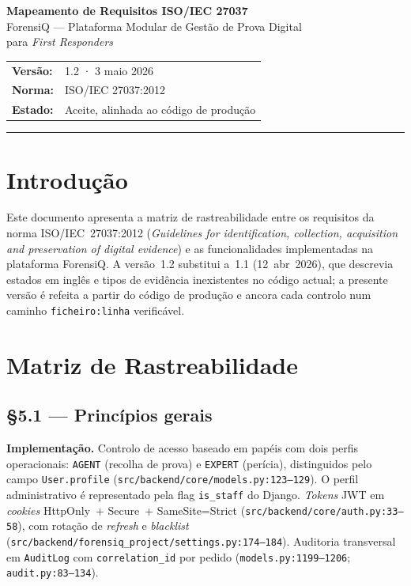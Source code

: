 \documentclass[a4paper,11pt]{article}
\begin{document}

\begin{center}
    {\LARGE\bfseries Mapeamento de Requisitos ISO/IEC 27037}\\[0.4em]
    {\large ForensiQ --- Plataforma Modular de Gestão de Prova Digital\\
    para \emph{First Responders}}\\[1.2em]
    \begin{tabular}{ll}
        \textbf{Versão:} & 1.2 · 3 maio 2026 \\
        \textbf{Norma:}  & ISO/IEC 27037:2012 \\
        \textbf{Estado:} & Aceite, alinhada ao código de produção \\
    \end{tabular}
\end{center}

\vspace{0.5em}\hrule\vspace{1.5em}

\section{Introdução}

Este documento apresenta a matriz de rastreabilidade entre os requisitos
da norma ISO/IEC~27037:2012 (\emph{Guidelines for identification,
collection, acquisition and preservation of digital evidence}) e as
funcionalidades implementadas na plataforma ForensiQ. A versão~1.2
substitui a~1.1 (12~abr~2026), que descrevia estados em inglês e tipos
de evidência inexistentes no código actual; a presente versão é
refeita a partir do código de produção e ancora cada controlo num
caminho \texttt{ficheiro:linha} verificável.

\section{Matriz de Rastreabilidade}

\subsection*{§5.1 --- Princípios gerais}

\textbf{Implementação.} Controlo de acesso baseado em papéis com dois
perfis operacionais: \texttt{AGENT} (recolha de prova) e \texttt{EXPERT}
(perícia), distinguidos pelo campo \texttt{User.profile}
(\texttt{src/backend/core/models.py:123--129}). O perfil
administrativo é representado pela flag \texttt{is\_staff} do Django.
\emph{Tokens} JWT em \emph{cookies} HttpOnly~+ Secure~+ SameSite=Strict
(\texttt{src/backend/core/auth.py:33--58}), com rotação de \emph{refresh}
e \emph{blacklist}
(\texttt{src/backend/forensiq\_project/settings.py:174--184}). Auditoria
transversal em \texttt{AuditLog} com \texttt{correlation\_id} por pedido
(\texttt{models.py:1199--1206}; \texttt{audit.py:83--134}).
\end{document}
